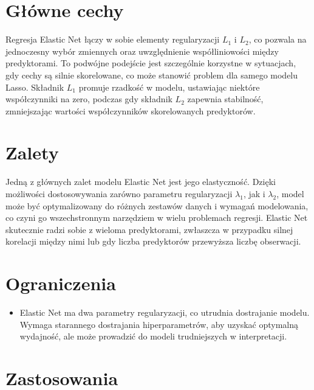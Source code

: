 {}
\section*{Główne cechy}
\vspace{-1.0em}
\label{sec:why_use_ml}


Regresja Elastic Net łączy w sobie elementy regularyzacji $L_1$ i $L_2$, co pozwala na jednoczesny wybór zmiennych oraz uwzględnienie współliniowości między predyktorami. To podwójne podejście jest szczególnie korzystne w sytuacjach, gdy cechy są silnie skorelowane, co może stanowić problem dla samego modelu Lasso. Składnik $L_1$ promuje rzadkość w modelu, ustawiając niektóre współczynniki na zero, podczas gdy składnik $L_2$ zapewnia stabilność, zmniejszając wartości współczynników skorelowanych predyktorów.


{}
\section*{Zalety }
\vspace{-1.0em}
\label{sec:ml_challenges}


Jedną z głównych zalet modelu Elastic Net jest jego elastyczność. Dzięki możliwości dostosowywania zarówno parametru regularyzacji $\lambda_1$, jak i $\lambda_2$, model może być optymalizowany do różnych zestawów danych i wymagań modelowania, co czyni go wszechstronnym narzędziem w wielu problemach regresji. Elastic Net skutecznie radzi sobie z wieloma predyktorami, zwłaszcza w przypadku silnej korelacji między nimi lub gdy liczba predyktorów przewyższa liczbę obserwacji.


{}
\section*{Ograniczenia }
\vspace{-1.0em}
\label{sec:ml_challenges}


\begin{itemize}

\item Elastic Net ma dwa parametry regularyzacji, co utrudnia dostrajanie modelu. Wymaga starannego dostrajania hiperparametrów, aby uzyskać optymalną wydajność, ale może prowadzić do modeli trudniejszych w interpretacji.
\end{itemize}

{}
\section*{Zastosowania }
\vspace{-1.0em}
\label{sec:ml_challenges}

